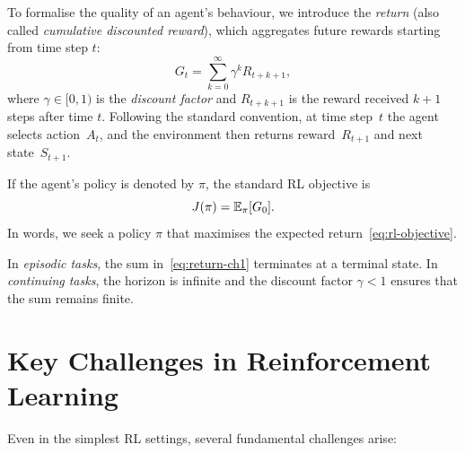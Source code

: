 To formalise the quality of an agent's behaviour, we introduce the \emph{return} (also called \emph{cumulative discounted reward}), which aggregates future rewards starting from time step $t$:
\begin{equation}
\label{eq:return-ch1}
G_t = \sum_{k=0}^{\infty}\gamma^k R_{t+k+1},
\end{equation}
where $\gamma\in[0,1)$ is the \emph{discount factor} and $R_{t+k+1}$ is the reward received $k+1$ steps after time $t$.  Following the standard convention, at time step~$t$ the agent selects action~$A_t$, and the environment then returns reward~$R_{t+1}$ and next state~$S_{t+1}$.

If the agent's policy is denoted by $\pi$, the standard RL objective is
\begin{equation}
\label{eq:rl-objective}
J(\pi)=\operatorname{\mathbb{E}}_{\pi}[G_0].
\end{equation}
In words, we seek a policy $\pi$ that maximises the expected return~\eqref{eq:rl-objective}.

\begin{remark}
\label{rem:episodic-continuing}
In \emph{episodic tasks}, the sum in~\eqref{eq:return-ch1} terminates at a terminal state.  In \emph{continuing tasks}, the horizon is infinite and the discount factor $\gamma<1$ ensures that the sum remains finite.
\end{remark}


\section{Key Challenges in Reinforcement Learning}
\label{sec:rl-challenges}

Even in the simplest RL settings, several fundamental challenges arise:


